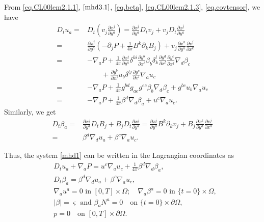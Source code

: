 \documentclass[12pt,reqno]{amsart}
\numberwithin{equation}{section}
\theoremstyle{definition}
\theoremstyle{remark}
\begin{document}
From \eqref{eq.CL00lem2.1.1}, $\eqref{mhd3.1}$, \eqref{eq.beta}, \eqref{eq.CL00lem2.1.3}, \eqref{eq.covtensor}, we have
\begin{align*}
D_t u_a=&D_t\left(v_j\frac{{\partial} x^j}{{\partial} y^a}\right) =\frac{{\partial} x^j}{{\partial} y^a}D_t v_j+v_jD_t\frac{{\partial} x^j}{{\partial} y^a}\\
  =&\frac{{\partial} x^j}{{\partial} y^a}\left(-{\partial}_j{P } +\frac{1}{4\pi}B^k{\partial}_k B_j\right)+v_j \frac{{\partial} x^k}{{\partial} y^a} \frac{{\partial} v^j}{{\partial} x^k}\\
  =&-{\nabla}_a{P } +\frac{1}{4\pi}\frac{{\partial} x^j}{{\partial} y^a}\delta^{ki}\frac{{\partial} y^b}{{\partial} x^i}\beta_b\delta_k^l \frac{{\partial} y^d}{{\partial} x^l} \frac{{\partial} y^c}{{\partial} x^j}{\nabla}_d\beta_c\\
  &\qquad+\frac{{\partial} y^b}{{\partial} x^j} u_b\delta^{lj}\frac{{\partial} y^c}{{\partial} x^l} {\nabla}_a u_c\\
  =&-{\nabla}_a{P } +\frac{1}{4\pi}g^{bd}g_{ae}g^{ec}\beta_b{\nabla}_d\beta_c+g^{bc} u_b{\nabla}_a u_c\\
  =&-{\nabla}_a{P } +\frac{1}{4\pi}\beta^d{\nabla}_d\beta_a+u^c{\nabla}_a u_c.
\end{align*}
Similarly, we get
\begin{align*}
  D_t\beta_a=&\frac{{\partial} x^j}{{\partial} y^a}D_t B_j+B_jD_t\frac{{\partial} x^j}{{\partial} y^a}
  =\frac{{\partial} x^j}{{\partial} y^a}B^k{\partial}_k v_j+B_j\frac{{\partial} x^k}{{\partial} y^a} \frac{{\partial} v^j}{{\partial} x^k}\\
  =&\beta^d{\nabla}_d u_a+\beta^c{\nabla}_a u_c.
\end{align*}

Thus, the system \eqref{mhd1} can be written in the Lagrangian coordinates as
\begin{subequations}\label{mhd41}
\begin{align}
    &D_tu_a+{\nabla}_a{P } =u^c{\nabla}_a u_c+\frac{1}{4\pi}\beta^d{\nabla}_d\beta_a,\label{mhd41.1}\\
    &D_t\beta_a=\beta^d{\nabla}_d u_a+\beta^c{\nabla}_a u_c,\label{mhd41.2}\\
    &{\nabla}_a u^a=0 \text{ in } [0,T]\times\Omega;\quad {\nabla}_a\beta^a=0 \text{ in } \{t=0\}\times \Omega,\label{mhd41.3}\\
    &|\beta|={\varsigma} \text{ and }  \beta_a N^a=0 \quad \text{on } \{t=0\}\times {\partial}\Omega,\label{mhd41.4}\\
    &p=0 \quad \text{on } [0,T]\times{\partial}\Omega.\label{mhd41.5}
\end{align}
\end{subequations}
\end{document}
